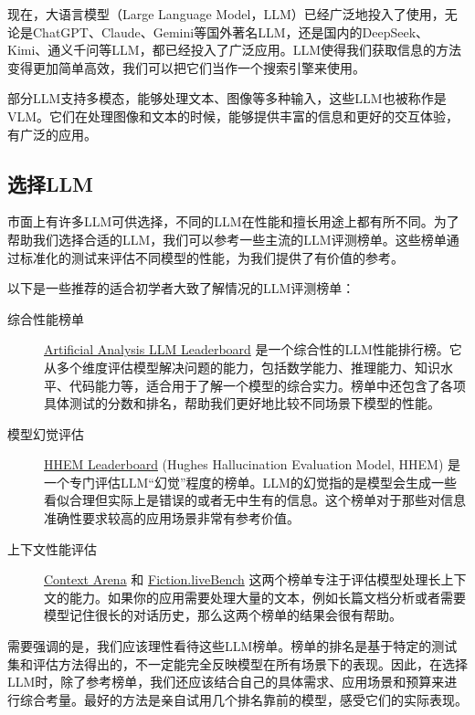 现在，大语言模型（Large Language Model，LLM）已经广泛地投入了使用，无论是ChatGPT、Claude、Gemini等国外著名LLM，还是国内的DeepSeek、Kimi、通义千问等LLM，都已经投入了广泛应用。LLM使得我们获取信息的方法变得更加简单高效，我们可以把它们当作一个搜索引擎来使用。

部分LLM支持多模态，能够处理文本、图像等多种输入，这些LLM也被称作是VLM。它们在处理图像和文本的时候，能够提供丰富的信息和更好的交互体验，有广泛的应用。

\subsection{选择LLM}

市面上有许多LLM可供选择，不同的LLM在性能和擅长用途上都有所不同。为了帮助我们选择合适的LLM，我们可以参考一些主流的LLM评测榜单。这些榜单通过标准化的测试来评估不同模型的性能，为我们提供了有价值的参考。

以下是一些推荐的适合初学者大致了解情况的LLM评测榜单：

\begin{description}
  \item[综合性能榜单] \href{https://artificialanalysis.ai/leaderboards/models}{Artificial Analysis LLM Leaderboard} 是一个综合性的LLM性能排行榜。它从多个维度评估模型解决问题的能力，包括数学能力、推理能力、知识水平、代码能力等，适合用于了解一个模型的综合实力。榜单中还包含了各项具体测试的分数和排名，帮助我们更好地比较不同场景下模型的性能。
  \item[模型幻觉评估] \href{https://vectara-leaderboard.hf.space/}{HHEM Leaderboard} (Hughes Hallucination Evaluation Model, HHEM) 是一个专门评估LLM“幻觉”程度的榜单。LLM的幻觉指的是模型会生成一些看似合理但实际上是错误的或者无中生有的信息。这个榜单对于那些对信息准确性要求较高的应用场景非常有参考价值。
  \item[上下文性能评估] \href{https://contextarena.ai/}{Context Arena} 和 \href{https://fiction.live/stories/Fiction-liveBench-May-22-2025/oQdzQvKHw8JyXbN87}{Fiction.liveBench} 这两个榜单专注于评估模型处理长上下文的能力。如果你的应用需要处理大量的文本，例如长篇文档分析或者需要模型记住很长的对话历史，那么这两个榜单的结果会很有帮助。
\end{description}

需要强调的是，我们应该理性看待这些LLM榜单。榜单的排名是基于特定的测试集和评估方法得出的，不一定能完全反映模型在所有场景下的表现。因此，在选择LLM时，除了参考榜单，我们还应该结合自己的具体需求、应用场景和预算来进行综合考量。最好的方法是亲自试用几个排名靠前的模型，感受它们的实际表现。

